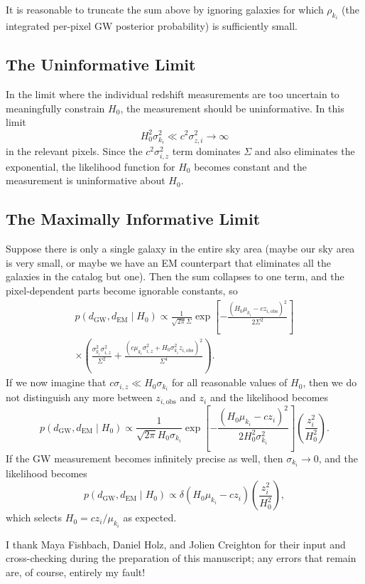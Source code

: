 \documentclass[modern]{aastex62}
\newcommand{\dEM}{d_{\mathrm{EM}}}
\newcommand{\dGW}{d_{\mathrm{GW}}}
\begin{document}
It is reasonable to truncate the sum above by ignoring galaxies for which
$\rho_{k_i}$ (the integrated per-pixel \ac{GW} posterior probability) is
sufficiently small.

\subsection{The Uninformative Limit}

In the limit where the individual redshift measurements are too uncertain to
meaningfully constrain $H_0$, the measurement should be uninformative.  In this
limit
%
\begin{equation}
  H_0^2 \sigma_{k_i}^2 \ll c^2 \sigma_{z,i}^2 \to \infty
\end{equation}
%
in the relevant pixels.  Since the $c^2 \sigma_{i,z}^2$ term dominates $\Sigma$
and also eliminates the exponential, the likelihood function for $H_0$ becomes
constant and the measurement is uninformative about $H_0$.

\subsection{The Maximally Informative Limit}

Suppose there is only a single galaxy in the entire sky area (maybe our sky area
is very small, or maybe we have an \ac{EM} counterpart that eliminates all the
galaxies in the catalog but one).  Then the sum collapses to one term, and the
pixel-dependent parts become ignorable constants, so
%
\begin{multline}
  p\left( \dGW, \dEM \mid H_0 \right) \propto \frac{1}{\sqrt{2\pi} \Sigma} \exp\left[ -\frac{\left(H_0 \mu_{k_i} - c z_{i,\mathrm{obs}}\right)^2}{2 \Sigma^2} \right] \\ \times \left( \frac{\sigma_{k_i}^2 \sigma_{i,z}^2}{\Sigma^2} + \frac{\left( c \mu_{k_i} \sigma_{i,z}^2 + H_0 \sigma_{k_i}^2 z_{i,\mathrm{obs}} \right)^2}{\Sigma^4} \right).
\end{multline}
%
If we now imagine that $c \sigma_{i,z} \ll H_0 \sigma_{k_i}$ for all reasonable
values of $H_0$, then we do not distinguish any more between
$z_{i,\mathrm{obs}}$ and $z_i$ and the likelihood becomes
%
\begin{equation}
  p\left( \dGW, \dEM \mid H_0 \right) \propto \frac{1}{\sqrt{2\pi} H_0 \sigma_{k_i}} \exp\left[ -\frac{\left(H_0 \mu_{k_i} - c z_{i}\right)^2}{2 H_0^2 \sigma_{k_i}^2} \right] \left( \frac{z_{i}^2}{H_0^2} \right).
\end{equation}
%
If the \ac{GW} measurement becomes infinitely precise as well, then
$\sigma_{k_i} \to 0$, and the likelihood becomes
%
\begin{equation}
  p\left( \dGW, \dEM \mid H_0 \right) \propto \delta \left( H_0 \mu_{k_i} - c z_{i}\right) \left( \frac{z_{i}^2}{H_0^2} \right),
\end{equation}
%
which selects $H_0 = c z_i / \mu_{k_i}$ as expected.

\acknowledgements

I thank Maya Fishbach, Daniel Holz, and Jolien Creighton for their input and
cross-checking during the preparation of this manuscript; any errors that remain
are, of course, entirely my fault!


\end{document}
